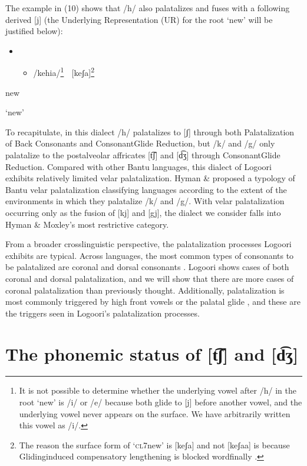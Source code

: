 \documentclass[output=paper]{langsci/langscibook}
\begin{document}
The example in (10) shows that /h/ also palatalizes and fuses with a following derived [j] (the Underlying Representation (UR) for the root ‘new’ will be justified below):

\begin{itemize}
\item \setcounter{itemize}{0}
\begin{itemize}
\item /kehia/\footnote{   It is not possible to determine whether the underlying vowel after /h/ in the root ‘new’ is /i/ or /e/ because both glide to [j] before another vowel, and the underlying vowel never appears on the surface. We have arbitrarily written this vowel as /i/. }    [keʃa]\footnote{   The reason the surface form of ‘\textsc{cl7}new’ is [keʃa] and not [keʃaa] is because Glidinginduced compensatory lengthening is blocked wordfinally \citep{Leung1991}. }

\end{itemize}
\end{itemize}

new

‘new’

To recapitulate, in this dialect /h/ palatalizes to [ʃ] through both Palatalization of Back Consonants and ConsonantGlide Reduction, but /k/ and /g/ only palatalize to the postalveolar affricates [t͡ʃ] and [d͡ʒ] through ConsonantGlide Reduction. Compared with other Bantu languages, this dialect of Logoori exhibits relatively limited velar palatalization. Hyman \& \citet{Moxley1996} proposed a typology of Bantu velar palatalization classifying languages according to the extent of the environments in which they palatalize /k/ and /g/. With velar palatalization occurring only as the fusion of [kj] and [gj], the dialect we consider falls into Hyman \& Moxley’s most restrictive category. 

From a broader crosslinguistic perspective, the palatalization processes Logoori exhibits are typical. Across languages, the most common types of consonants to be palatalized are coronal and dorsal consonants \citep{Bateman2011}. Logoori shows cases of both coronal and dorsal palatalization, and we will show that there are more cases of coronal palatalization than previously thought. Additionally, palatalization is most commonly triggered by high front vowels or the palatal glide \citep{Bateman2011}, and these are the triggers seen in Logoori’s palatalization processes.

\section{The phonemic status of [t͡ʃ] and [d͡ʒ]} %
\end{document}
